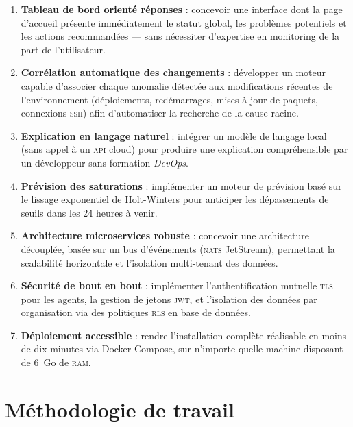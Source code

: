 \begin{enumerate}[label=\textbf{O\arabic*.}, leftmargin=2.2cm]
  \item \textbf{Tableau de bord orienté réponses} : concevoir une interface dont
    la page d'accueil présente immédiatement le statut global, les problèmes
    potentiels et les actions recommandées --- sans nécessiter d'expertise
    en monitoring de la part de l'utilisateur.

  \item \textbf{Corrélation automatique des changements} : développer un moteur
    capable d'associer chaque anomalie détectée aux modifications récentes de
    l'environnement (déploiements, redémarrages, mises à jour de paquets,
    connexions \textsc{ssh}) afin d'automatiser la recherche de la cause racine.

  \item \textbf{Explication en langage naturel} : intégrer un modèle de langage
    local (sans appel à un \textsc{api} cloud) pour produire une explication
    compréhensible par un développeur sans formation \textit{DevOps}.

  \item \textbf{Prévision des saturations} : implémenter un moteur de prévision
    basé sur le lissage exponentiel de Holt-Winters pour anticiper les dépassements
    de seuils dans les 24 heures à venir.

  \item \textbf{Architecture microservices robuste} : concevoir une architecture
    découplée, basée sur un bus d'événements (\textsc{nats} JetStream), permettant
    la scalabilité horizontale et l'isolation multi-tenant des données.

  \item \textbf{Sécurité de bout en bout} : implémenter l'authentification mutuelle
    \textsc{tls} pour les agents, la gestion de jetons \textsc{jwt}, et l'isolation
    des données par organisation via des politiques \textsc{rls} en base de données.

  \item \textbf{Déploiement accessible} : rendre l'installation complète réalisable
    en moins de dix minutes via Docker Compose, sur n'importe quelle machine disposant
    de 6~Go de \textsc{ram}.
\end{enumerate}

\section{Méthodologie de travail}

